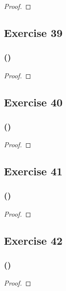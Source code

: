 \documentclass[14pt]{extarticle}
\begin{document}
\begin{proof}

\end{proof}

\subsection{Exercise 39}

\subsubsection{()}

\begin{proof}

\end{proof}

\subsection{Exercise 40}

\subsubsection{()}

\begin{proof}

\end{proof}

\subsection{Exercise 41}

\subsubsection{()}

\begin{proof}

\end{proof}

\subsection{Exercise 42}

\subsubsection{()}

\begin{proof}

\end{proof}
\end{document}
